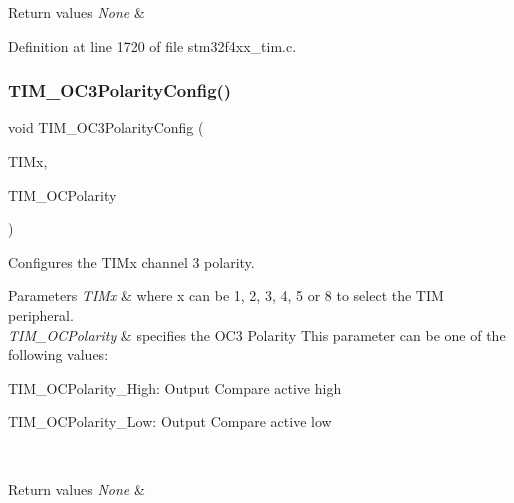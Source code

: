 \begin{DoxyRetVals}{Return values}
{\em None} & \\
\hline
\end{DoxyRetVals}


Definition at line 1720 of file stm32f4xx\+\_\+tim.\+c.

\mbox{\label{group___t_i_m___group2_ga1ef43b03fe666495e80aac9741ae7ab0}} 
\subsubsection{\texorpdfstring{T\+I\+M\+\_\+\+O\+C3\+Polarity\+Config()}{TIM\_OC3PolarityConfig()}}
{\footnotesize\ttfamily void T\+I\+M\+\_\+\+O\+C3\+Polarity\+Config (\begin{DoxyParamCaption}\item[{\hyperlink{struct_t_i_m___type_def}{T\+I\+M\+\_\+\+Type\+Def} $\ast$}]{T\+I\+Mx,  }\item[{uint16\+\_\+t}]{T\+I\+M\+\_\+\+O\+C\+Polarity }\end{DoxyParamCaption})}



Configures the T\+I\+Mx channel 3 polarity. 


\begin{DoxyParams}{Parameters}
{\em T\+I\+Mx} & where x can be 1, 2, 3, 4, 5 or 8 to select the T\+IM peripheral. \\
\hline
{\em T\+I\+M\+\_\+\+O\+C\+Polarity} & specifies the O\+C3 Polarity This parameter can be one of the following values\+: \begin{DoxyItemize}
\item T\+I\+M\+\_\+\+O\+C\+Polarity\+\_\+\+High\+: Output Compare active high \item T\+I\+M\+\_\+\+O\+C\+Polarity\+\_\+\+Low\+: Output Compare active low \end{DoxyItemize}
\\
\hline
\end{DoxyParams}

\begin{DoxyRetVals}{Return values}
{\em None} & \\
\hline
\end{DoxyRetVals}



